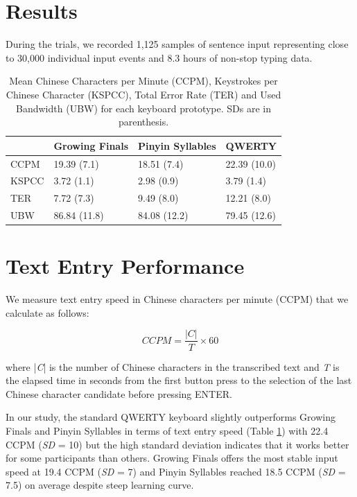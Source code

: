 \section{Results}
During the trials, we recorded 1,125 samples of sentence input representing close to 30,000 individual input events and 8.3 hours of non-stop typing data.


\begin{table}[]
\renewcommand{\arraystretch}{1.7}
\centering
\caption{Mean Chinese Characters per Minute (CCPM), Keystrokes per Chinese Character (KSPCC), Total Error Rate (TER) and Used Bandwidth (UBW) for each keyboard prototype. SDs are in parenthesis.}
\label{table:CCPM_KSPCC_TER_UBW}
\begin{tabular}{llll}

      & Growing Finals & Pinyin Syllables & QWERTY          \\ \hline
CCPM  & 19.39 (7.1)    & 18.51 (7.4)      & 22.39 (10.0)    \\
KSPCC & 3.72 (1.1)     & 2.98 (0.9)       & 3.79 (1.4)      \\
TER   & 7.72 (7.3)     & 9.49 (8.0)       & 12.21 (8.0)     \\
UBW   & 86.84 (11.8)   & 84.08 (12.2)     & 79.45 (12.6)    \\ \hline
\end{tabular}
\end{table}






\section{Text Entry Performance}
We measure text entry speed in Chinese characters per minute (CCPM) that we calculate as follows:

\[ CCPM = \frac{|C|}{T} \times 60 \]

where |\textit{C}| is the number of Chinese characters in the transcribed text and \textit{T} is the elapsed time in seconds from the first button press to the selection of the last Chinese character candidate before pressing ENTER.





In our study, the standard QWERTY keyboard slightly outperforms Growing Finals and Pinyin Syllables in terms of text entry speed (Table \ref{table:CCPM_KSPCC_TER_UBW}) with 22.4 CCPM (\textit{SD} = 10) but the high standard deviation indicates that it works better for some participants than others. Growing Finals offers the most stable input speed at 19.4 CCPM (\textit{SD} = 7) and Pinyin Syllables reached 18.5 CCPM (\textit{SD} = 7.5) on average despite steep learning curve.


